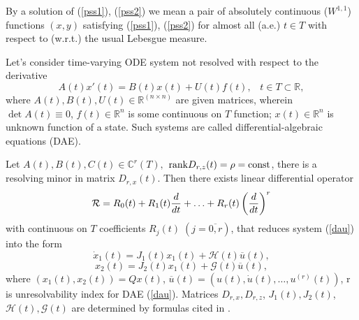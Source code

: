 \documentclass[12pt]{llncs}
\begin{document}
By a solution of (\ref{pss1}), (\ref{pss2}) we mean a pair of absolutely continuous ($W^{1,1}$) functions $(x, y)$ satisfying (\ref{pss1}), (\ref{pss2}) for almost all (a.e.) $t \in T$ with respect to (w.r.t.) the usual Lebesgue measure.


Let's consider time-varying ODE system not resolved with respect to the derivative
\begin{equation}\label{dau}
A(t)x'(t)=B(t)x(t) + U(t)f(t), \;\;\; t \in T \subset {\mathbb R},
\end{equation}
where $A(t), B(t), U(t) \in \mathbb R^{(n\times n)}$ are given matrices, wherein $\det A(t) \equiv 0$, $f(t) \in {\mathbb R}^n$ is some continuous on $T$ function; $x(t) \in {\mathbb R}^n$ is unknown function of a state. Such systems are called differential-algebraic equations (DAE). 

\begin{lemma}{\rm \cite{SCH2008}}
Let $A(t), B(t), C(t) \in \mathbb C^r(T),$ ${\rm rank} D_{r,z}(t) = \rho = {\rm const}$, there is a resolving minor in matrix $D_{r,x}(t)$. Then there exists linear differential operator
$$
{\mathcal R}=R_0(t) +R_1(t){{d}\over{dt}}+\ldots +R_r(t)\left( {{d}\over{dt}}\right) ^r
$$
with continuous on $T$ coefficients
$R_j(t)\; (j=\overline{0,r})$, that reduces system (\ref{dau}) into the form
$$
\dot{x}_1(t) = J_1(t)x_1(t)+{\mathcal H}(t) \overline{u}(t),
$$
$$
x_2(t) = J_2(t)x_1(t)+{\mathcal G}(t) \overline{u}(t),
$$
where $\left( x_1(t), x_2(t) \right)=Qx(t)$, $\overline{u}(t) = (u(t), \dot{u}(t),\ldots, u^{(r)}(t))$, r is unresolvability index for DAE (\ref{dau}). Matrices $D_{r,x}, D_{r,z}$, $J_1(t), J_2(t)$, ${\mathcal H}(t), {\mathcal G}(t)$ are determined by formulas cited in \cite{SCH2008}.
\end{lemma}
\end{document}
